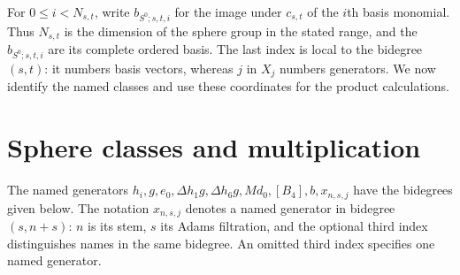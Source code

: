 For $0\le i<N_{s,t}$, write $b_{S^0;s,t,i}$ for the image under
$c_{s,t}$ of the $i$th basis monomial. Thus $N_{s,t}$ is the
dimension of the sphere group in the stated range, and the $b_{S^0;s,t,i}$
are its complete ordered basis. The last index is local to the
bidegree $(s,t)$: it numbers basis vectors, whereas $j$ in $X_j$
numbers generators. We now identify the named classes and use these
coordinates for the product calculations.

\section{Sphere classes and multiplication}

The named generators
$h_i,g,e_0,\Delta h_1g,\Delta h_6g,Md_0,[B_4],b,x_{n,s,j}$ have the
bidegrees given below. The notation $x_{n,s,j}$ denotes a named generator in
bidegree $(s,n+s)$: $n$ is its stem, $s$ its Adams filtration, and the
optional third index distinguishes names in the same bidegree. An omitted
third index specifies one named generator.

